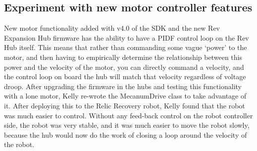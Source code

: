 \documentclass{article}
\begin{document}
\subsection{Experiment with new motor controller features} 
New motor functionality added with v4.0 of the SDK and the new Rev Expansion Hub firmware has the ability to have a PIDF control loop on the Rev Hub itself. This means that rather than commanding some vague `power' to the motor, and then having to empirically determine the relationship between this power and the velocity of the motor, you can directly command a velocity, and the control loop on board the hub will match that velocity regardless of voltage droop. After upgrading the firmware in the hubs and testing this functionality with a lone motor, Kelly re-wrote the MecanumDrive class to take advantage of it. After deploying this to the Relic Recovery robot, Kelly found that the robot was much easier to control. Without any feed-back control on the robot controller side, the robot was very stable, and it was much easier to move the robot slowly, because the hub would now do the work of closing a loop around the velocity of the robot.
\end{document}
